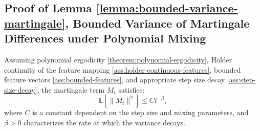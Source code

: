 \subsection{Proof of Lemma \ref{lemma:bounded-variance-martingale}, Bounded Variance of Martingale Differences under Polynomial Mixing}
\label{app:proof-bounded-variance-martingale}

\begin{lemmaapp*}
Assuming polynomial ergodicity \ref{theorem:polynomial-ergodicity}, Hölder continuity of the feature mapping \ref{ass:holder-continuous-features}, bounded feature vectors \ref{ass:bounded-features}, and appropriate step size decay \ref{ass:step-size-decay}, the martingale term \( M_t \) satisfies:
\[
\mathbb{E}[\|M_t\|^2] \leq C t^{-\beta},
\]
where \( C \) is a constant dependent on the step size and mixing parameters, and \( \beta > 0 \) characterizes the rate at which the variance decays.
\end{lemmaapp*}

